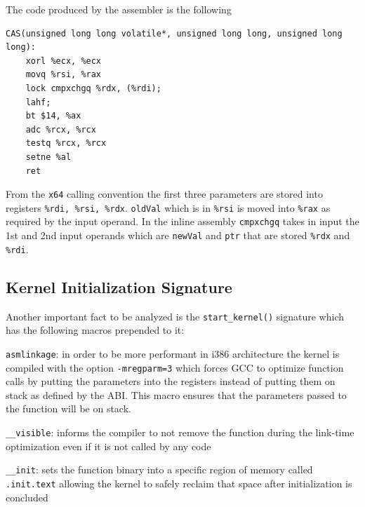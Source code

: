 \documentclass[twoside]{article}
\begin{document}
The code produced by the assembler is the following

\begin{verbatim}
CAS(unsigned long long volatile*, unsigned long long, unsigned long long):
    xorl %ecx, %ecx
    movq %rsi, %rax
    lock cmpxchgq %rdx, (%rdi);
    lahf;
    bt $14, %ax 
    adc %rcx, %rcx
    testq %rcx, %rcx
    setne %al
    ret
\end{verbatim}

From the \texttt{x64} calling convention the first three parameters are stored into registers \texttt{\%rdi, \%rsi, \%rdx}. \texttt{oldVal} which is in \texttt{\%rsi} is moved into \texttt{\%rax} as required by the input operand. In the inline assembly \texttt{cmpxchgq} takes in input the 1st and 2nd input operands which are \texttt{newVal} and \texttt{ptr} that are stored \texttt{\%rdx} and \texttt{\%rdi}.

\subsection{Kernel Initialization Signature}

Another important fact to be analyzed is the \texttt{start_kernel()} signature which has the following macros prepended to it:

\begin{description}
    \item \texttt{asmlinkage}: in order to be more performant in i386 architecture the kernel is compiled with the option \texttt{-mregparm=3} which forces GCC to optimize function calls by putting the parameters into the registers instead of putting them on stack as defined by the ABI. This macro ensures that the parameters passed to the function will be on stack. 
    \item \texttt{__visible}: informs the compiler to not remove the function during the link-time optimization even if it is not called by any code
    \item \texttt{__init}: sets the function binary into a specific region of memory called \texttt{.init.text} allowing the kernel to safely reclaim that space after initialization is concluded
\end{description}

\newpage


\end{document}
